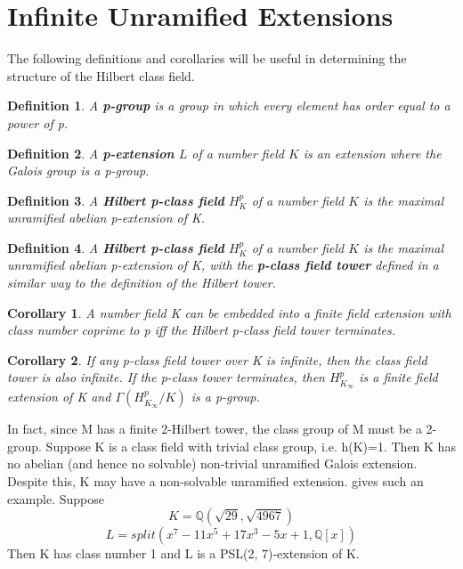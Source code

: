 \documentclass[preprint,12pt,reqno]{elsarticle}
\newtheorem{corollary}{Corollary}[theorem]
\newtheorem{definition}{Definition}
\begin{document}
\section{Infinite Unramified Extensions}
The following definitions and corollaries will be useful in determining the structure of the Hilbert class field. 
\begin{definition}
A \textbf{p-group} is a group in which every element has order equal to a power of p.
\end{definition}
\begin{definition}
A \textbf{p-extension} $L$ of a number field $K$ is an extension where the Galois group is a p-group.
\end{definition}
\begin{definition}
A \textbf{Hilbert p-class field} $H_K^{p}$ of a number field $K$ is the maximal unramified abelian p-extension of K.
\end{definition}
\begin{definition}
A \textbf{Hilbert p-class field} $H_K^{p}$ of a number field $K$ is the maximal unramified abelian p-extension of K, with the \textbf{p-class field tower} defined in a similar way to the definition of the Hilbert tower. 
\end{definition}
\begin{corollary}
 A number field K can be embedded into a finite field extension with class number coprime to p iff the Hilbert p-class field tower terminates.
\end{corollary}
\begin{corollary}
If any p-class field tower over K is infinite, then the class field tower is also infinite. If the p-class tower terminates, then $H_{K_\infty}^{p}$ is a finite field extension of K and $\Gamma(H_{K_\infty}^{p}/K)$ is a p-group.
\end{corollary}
In fact, since M has a finite 2-Hilbert tower, the class group of M must be a 2-group. 
Suppose K is a class field with trivial class group, i.e. h(K)=1. Then K has no abelian (and hence no
solvable) non-trivial unramified Galois extension. Despite this, K may have a non-solvable unramified extension. \cite{BRIN} gives such an example. Suppose
\begin{equation}
   K=\mathbb{Q}(\sqrt{29},\sqrt{4967}) 
\end{equation}
\begin{equation}
   L=split(x^7 - 11x^5 + 17x^3 - 5x + 1,\mathbb{Q}[x])
\end{equation}
Then K has class number 1 and L is a PSL(2, 7)-extension of K.
\end{document}
